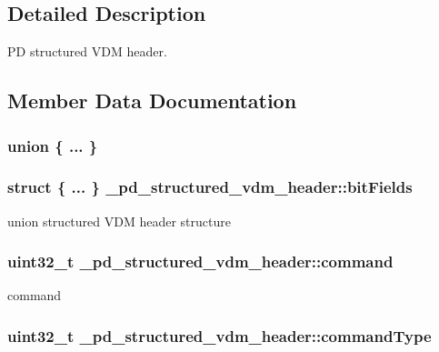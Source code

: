 \subsection{Detailed Description}
P\-D structured V\-D\-M header. 

\subsection{Member Data Documentation}
\hypertarget{struct__pd__structured__vdm__header_ad81a4fe2b7dc1e0ec659f27d52344596}{\subsubsection[{"@41}]{\setlength{\rightskip}{0pt plus 5cm}union \{ ... \} }}\label{struct__pd__structured__vdm__header_ad81a4fe2b7dc1e0ec659f27d52344596}
\hypertarget{struct__pd__structured__vdm__header_afc8471a70fa430820836286de3cf2281}{
\subsubsection[{bit\-Fields}]{\setlength{\rightskip}{0pt plus 5cm}struct \{ ... \}   \-\_\-pd\-\_\-structured\-\_\-vdm\-\_\-header\-::bit\-Fields}}\label{struct__pd__structured__vdm__header_afc8471a70fa430820836286de3cf2281}
union structured V\-D\-M header structure \hypertarget{struct__pd__structured__vdm__header_aada24db165d116acd79aa1a44a30d2e1}{
\subsubsection[{command}]{\setlength{\rightskip}{0pt plus 5cm}uint32\-\_\-t \-\_\-pd\-\_\-structured\-\_\-vdm\-\_\-header\-::command}}\label{struct__pd__structured__vdm__header_aada24db165d116acd79aa1a44a30d2e1}
command \hypertarget{struct__pd__structured__vdm__header_a8146babffdd0022316369e0631995bf1}{
\subsubsection[{command\-Type}]{\setlength{\rightskip}{0pt plus 5cm}uint32\-\_\-t \-\_\-pd\-\_\-structured\-\_\-vdm\-\_\-header\-::command\-Type}}\label{struct__pd__structured__vdm__header_a8146babffdd0022316369e0631995bf1}
